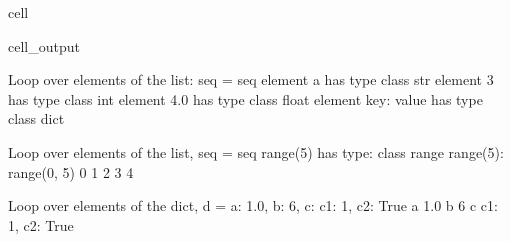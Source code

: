 \documentclass[letterpaper,10pt,english]{jupyterBook}
\begin{document}
\begin{sphinxuseclass}{cell}
\begin{sphinxVerbatimOutput}
\begin{sphinxuseclass}{cell_output}
\begin{sphinxVerbatim}[commandchars=\\\{\}]
Loop over elements of the list: seq = \PYGZob{}seq\PYGZcb{}
element a has type \PYGZlt{}class \PYGZsq{}str\PYGZsq{}\PYGZgt{}
element 3 has type \PYGZlt{}class \PYGZsq{}int\PYGZsq{}\PYGZgt{}
element 4.0 has type \PYGZlt{}class \PYGZsq{}float\PYGZsq{}\PYGZgt{}
element \PYGZob{}\PYGZsq{}key\PYGZsq{}: \PYGZsq{}value\PYGZsq{}\PYGZcb{} has type \PYGZlt{}class \PYGZsq{}dict\PYGZsq{}\PYGZgt{}

Loop over elements of the list, seq = \PYGZob{}seq\PYGZcb{}
range(5) has type: \PYGZlt{}class \PYGZsq{}range\PYGZsq{}\PYGZgt{}
range(5): range(0, 5)
0
1
2
3
4

Loop over elements of the dict, d = \PYGZob{}\PYGZsq{}a\PYGZsq{}: 1.0, \PYGZsq{}b\PYGZsq{}: 6, \PYGZsq{}c\PYGZsq{}: \PYGZob{}\PYGZsq{}c1\PYGZsq{}: 1, \PYGZsq{}c2\PYGZsq{}: True\PYGZcb{}\PYGZcb{}
a 1.0
b 6
c \PYGZob{}\PYGZsq{}c1\PYGZsq{}: 1, \PYGZsq{}c2\PYGZsq{}: True\PYGZcb{}
\end{sphinxVerbatim}

\end{sphinxuseclass}\end{sphinxVerbatimOutput}

\end{sphinxuseclass}
\end{document}
